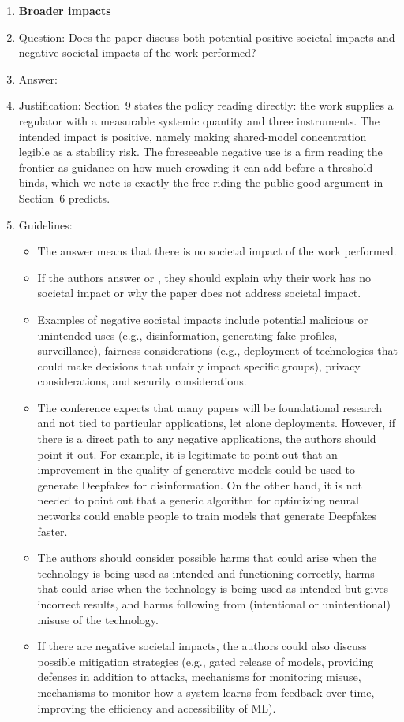 \begin{enumerate}
\item {\bf Broader impacts}
    \item[] Question: Does the paper discuss both potential positive societal impacts and negative societal impacts of the work performed?
    \item[] Answer: \answerYes{}
    \item[] Justification: Section~9 states the policy reading directly: the work supplies a regulator with a measurable systemic quantity and three instruments. The intended impact is positive, namely making shared-model concentration legible as a stability risk. The foreseeable negative use is a firm reading the frontier as guidance on how much crowding it can add before a threshold binds, which we note is exactly the free-riding the public-good argument in Section~6 predicts.
    \item[] Guidelines:
    \begin{itemize}
        \item The answer \answerNA{} means that there is no societal impact of the work performed.
        \item If the authors answer \answerNA{} or \answerNo, they should explain why their work has no societal impact or why the paper does not address societal impact.
        \item Examples of negative societal impacts include potential malicious or unintended uses (e.g., disinformation, generating fake profiles, surveillance), fairness considerations (e.g., deployment of technologies that could make decisions that unfairly impact specific groups), privacy considerations, and security considerations.
        \item The conference expects that many papers will be foundational research and not tied to particular applications, let alone deployments. However, if there is a direct path to any negative applications, the authors should point it out. For example, it is legitimate to point out that an improvement in the quality of generative models could be used to generate Deepfakes for disinformation. On the other hand, it is not needed to point out that a generic algorithm for optimizing neural networks could enable people to train models that generate Deepfakes faster.
        \item The authors should consider possible harms that could arise when the technology is being used as intended and functioning correctly, harms that could arise when the technology is being used as intended but gives incorrect results, and harms following from (intentional or unintentional) misuse of the technology.
        \item If there are negative societal impacts, the authors could also discuss possible mitigation strategies (e.g., gated release of models, providing defenses in addition to attacks, mechanisms for monitoring misuse, mechanisms to monitor how a system learns from feedback over time, improving the efficiency and accessibility of ML).
    \end{itemize}
    

\end{enumerate}

